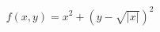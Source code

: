\documentclass[preview]{standalone}
\begin{document}
\begin{align*}
f(x, y) = x^2 + (y - \sqrt{|x|})^2
\end{align*}
\end{document}
